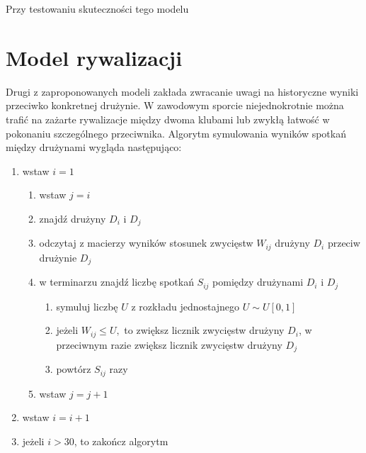 \documentclass[inzynierska]{pwr_wmat_praca_dyplomowa}
\theoremstyle{plain}
\numberwithin{theorem}{chapter}
\theoremstyle{definition}
\numberwithin{theorem}{chapter}
\begin{document}
Przy testowaniu skuteczności tego modelu 

\section{Model rywalizacji}
Drugi z zaproponowanych modeli zakłada zwracanie uwagi na historyczne wyniki przeciwko konkretnej drużynie. W zawodowym sporcie niejednokrotnie można trafić na zażarte rywalizacje między dwoma klubami lub zwykłą łatwość w pokonaniu szczególnego przeciwnika. Algorytm symulowania wyników spotkań między drużynami wygląda następująco:
\begin{enumerate}
	\item wstaw $i=1$
	\begin{enumerate}
		\item wstaw $j=i$
		\item znajdź drużyny $D_i$ i $D_j$
		\item odczytaj z macierzy wyników stosunek zwycięstw $W_{ij}$ drużyny $D_i$ przeciw drużynie $D_j$   
		\item w terminarzu znajdź liczbę spotkań $S_{ij}$ pomiędzy drużynami $D_i$ i $D_j$
		\begin{enumerate}
			\item symuluj liczbę $U$ z rozkładu jednostajnego $U\sim U[0,1]$ 
			\item jeżeli $W_{ij} \leq U,$ to zwiększ licznik zwycięstw drużyny $D_i$, w przeciwnym razie zwiększ licznik zwycięstw drużyny $D_j$
			\item powtórz $S_{ij}$ razy
		\end{enumerate}
		\item wstaw $j=j+1$
	\end{enumerate}
	\item wstaw $i=i+1$
	\item jeżeli $i> 30$, to zakończ algorytm
\end{enumerate} 
\end{document}
